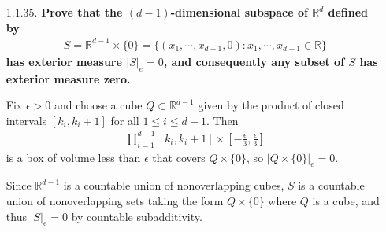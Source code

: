 \documentclass[a4paper,12pt]{article}
\begin{document}
\begin{enumerate}
    \item[1.1.35.]
        \boldmath\textbf{Prove that the $(d - 1)$-dimensional subspace of $\mathbb{R}^d$ defined by
        \begin{align*}
            S = \mathbb{R}^{d - 1} \times \{0\} = \{ (x_1, \cdots, x_{d - 1}, 0) : x_1, \cdots, x_{d - 1} \in \mathbb{R} \}
        \end{align*}
        has exterior measure $|S|_e = 0$, and consequently any subset of $S$ has exterior measure zero.
        }\unboldmath \par
        \iffalse
            We will prove this by induction on $d$. The statement is obvious for $d = 1$ since in this case $S$ is finite and hence countable. Now, assuming the statement holds for $d = k - 1$ where $k \geq 2$, we have for $d = k$ that
            \begin{align*}
                S = \mathbb{R}^{k - 1} \times \{0\} = \mathbb{R} \times (\mathbb{R}^{k - 2} \times \{0\}),
            \end{align*}
        \fi
        Fix $\epsilon > 0$ and choose a cube $Q \subset \mathbb{R}^{d - 1}$ given by the product of closed intervals $[k_i, k_i + 1]$ for all $1 \leq i \leq d - 1$. Then
        \begin{align*}
            \prod_{i = 1}^{d - 1} [k_i, k_i + 1] \times \left[ -\frac{\epsilon}{3}, \frac{\epsilon}{3} \right]
        \end{align*}
        is a box of volume less than $\epsilon$ that covers $Q \times \{0\}$, so $|Q \times \{0\}|_e = 0$. \par
        Since $\mathbb{R}^{d - 1}$ is a countable union of nonoverlapping cubes, $S$ is a countable union of nonoverlapping sets taking the form $Q \times \{0\}$ where $Q$ is a cube, and thus $|S|_e = 0$ by countable subadditivity.


\end{enumerate}
\end{document}

